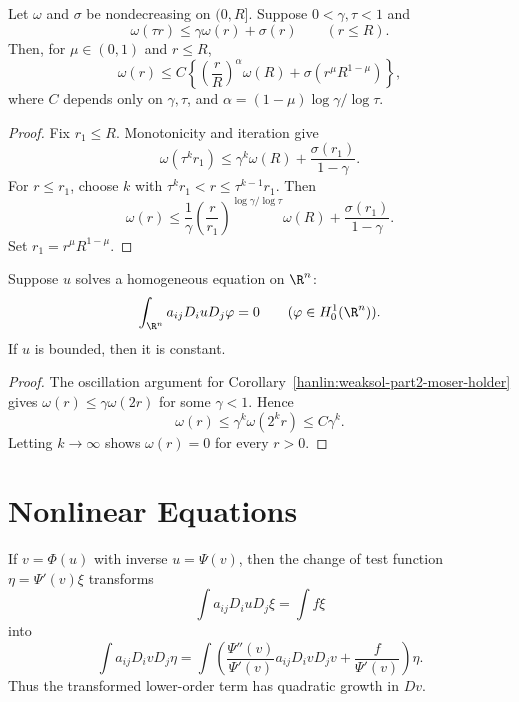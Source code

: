 \begin{lemma}\label{hanlin:weaksol-part2-oscillation-iteration}
Let $\omega$ and $\sigma$ be nondecreasing on $(0,R]$. Suppose
$0<\gamma,\tau<1$ and
\[
\omega(\tau r)\leq\gamma\omega(r)+\sigma(r)
\qquad(r\leq R).
\]
Then, for $\mu\in(0,1)$ and $r\leq R$,
\[
\omega(r)\leq C\left\{
\left(\frac rR\right)^\alpha\omega(R)
+\sigma(r^\mu R^{1-\mu})\right\},
\]
where $C$ depends only on $\gamma,\tau$, and
$\alpha=(1-\mu)\log\gamma/\log\tau$.
\end{lemma}
\begin{proof}
\sketch Fix $r_1\leq R$. Monotonicity and iteration give
\[
\omega(\tau^kr_1)
\leq\gamma^k\omega(R)+\frac{\sigma(r_1)}{1-\gamma}.
\]
For $r\leq r_1$, choose $k$ with
$\tau^kr_1<r\leq\tau^{k-1}r_1$. Then
\[
\omega(r)\leq\frac1\gamma
\left(\frac r{r_1}\right)^{\log\gamma/\log\tau}\omega(R)
+\frac{\sigma(r_1)}{1-\gamma}.
\]
Set $r_1=r^\mu R^{1-\mu}$.
\end{proof}

\begin{corollary}\label{hanlin:weaksol-part2-liouville}
Suppose $u$ solves a homogeneous equation on $\R^n$:
\[
\int_{\R^n}a_{ij}D_i uD_j\varphi=0
\qquad(\varphi\in H^1_0(\R^n)).
\]
If $u$ is bounded, then it is constant.
\end{corollary}
\begin{proof}
\sketch The oscillation argument for
Corollary~\ref{hanlin:weaksol-part2-moser-holder} gives
$\omega(r)\leq\gamma\omega(2r)$ for some $\gamma<1$. Hence
\[
\omega(r)\leq\gamma^k\omega(2^kr)\leq C\gamma^k.
\]
Letting $k\to\infty$ shows $\omega(r)=0$ for every $r>0$.
\end{proof}

\section{Nonlinear Equations}

If $v=\Phi(u)$ with inverse $u=\Psi(v)$, then the change of test function
$\eta=\Psi'(v)\xi$ transforms
\[
\int a_{ij}D_i uD_j\xi=\int f\xi
\]
into
\[
\int a_{ij}D_i vD_j\eta
=\int\left(
\frac{\Psi''(v)}{\Psi'(v)}a_{ij}D_i vD_j v
+\frac{f}{\Psi'(v)}\right)\eta.
\]
Thus the transformed lower-order term has quadratic growth in $Dv$.

